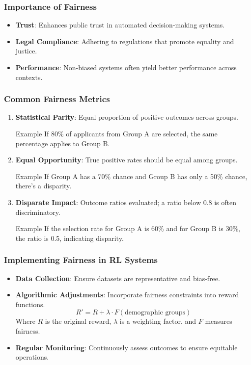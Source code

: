 \documentclass{beamer}
\begin{document}
\begin{frame}[fragile]
    \frametitle{Importance of Fairness}
    \begin{itemize}
        \item \textbf{Trust}: Enhances public trust in automated decision-making systems.
        \item \textbf{Legal Compliance}: Adhering to regulations that promote equality and justice.
        \item \textbf{Performance}: Non-biased systems often yield better performance across contexts.
    \end{itemize}
\end{frame}

\begin{frame}[fragile]
    \frametitle{Common Fairness Metrics}
    \begin{enumerate}
        \item \textbf{Statistical Parity}: Equal proportion of positive outcomes across groups.
              \begin{block}{Example}
                  If 80\% of applicants from Group A are selected, the same percentage applies to Group B.
              \end{block}
        \item \textbf{Equal Opportunity}: True positive rates should be equal among groups.
              \begin{block}{Example}
                  If Group A has a 70\% chance and Group B has only a 50\% chance, there's a disparity.
              \end{block}
        \item \textbf{Disparate Impact}: Outcome ratios evaluated; a ratio below 0.8 is often discriminatory.
              \begin{block}{Example}
                  If the selection rate for Group A is 60\% and for Group B is 30\%, the ratio is 0.5, indicating disparity.
              \end{block}
    \end{enumerate}
\end{frame}

\begin{frame}[fragile]
    \frametitle{Implementing Fairness in RL Systems}
    \begin{itemize}
        \item \textbf{Data Collection}: Ensure datasets are representative and bias-free.
        \item \textbf{Algorithmic Adjustments}: Incorporate fairness constraints into reward functions.
              \begin{equation}
                  R' = R + \lambda \cdot F(\text{demographic groups})
              \end{equation}
              Where \( R \) is the original reward, \( \lambda \) is a weighting factor, and \( F \) measures fairness.
        \item \textbf{Regular Monitoring}: Continuously assess outcomes to ensure equitable operations.
    \end{itemize}
\end{frame}
\end{document}
